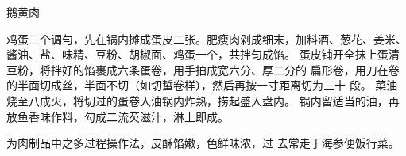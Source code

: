 \begin{recipe}{鹅黄肉}

\ingredients


\cooking

\step 鸡蛋三个调勻，先在锅内摊成蛋皮二张。肥瘦肉剁成细末，加料酒、葱花、姜米、
酱油、盐、味精、豆粉、胡椒面、鸡蛋一个，共拌匀成馅。
\step 蛋皮铺开全抹上蛋清豆粉，将拌好的馅裹成六条蛋卷，用手拍成宽六分、厚二分的
扁形卷，用刀在卷的半面切成丝，半面不切（如切蜇卷样），然后再按一寸距离切为三十
段。
\step 菜油烧至八成火，将切过的蛋卷入油锅内炸熟，捞起盛入盘内。
\step 锅内留适当的油，再放鱼香味作料，勾成二流芡滋汁，淋上即成。

\notes

为肉制品中之多过程操作法，皮酥馅嫩，色鲜味浓，过 去常走于海参便饭行菜。

\end{recipe}

